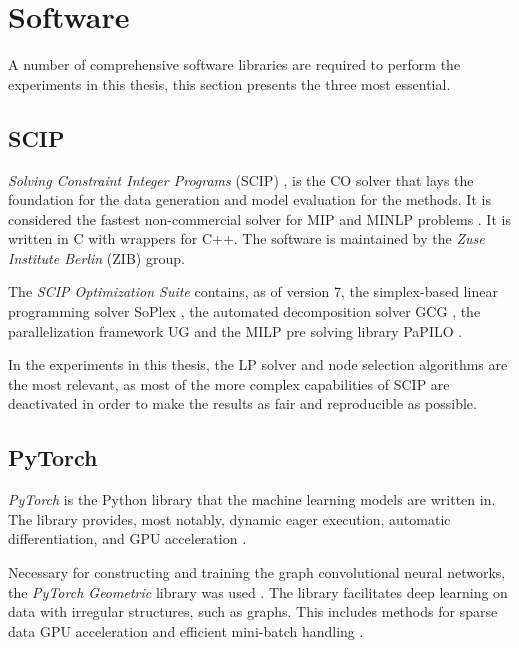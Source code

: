\section{Software}

A number of comprehensive software libraries are required to perform the experiments in this thesis, this section presents the three most essential.  


\subsection{SCIP}

\textit{Solving Constraint Integer Programs }(\gls{SCIP})
\cite{achterberg2009scip}, is the \gls{CO} solver that lays the foundation for the data generation and model evaluation for the methods. It is considered the fastest non-commercial solver for \gls{MIP} and \gls{MINLP} problems \cite{gamrath2020scip}. It is written in C with wrappers for C++. The software is maintained by the\textit{ Zuse Institute Berlin} (ZIB) group. 

The \textit{SCIP Optimization Suite} contains, as of version 7, the simplex-based linear programming solver SoPlex \cite{wunderling1996soplex}, the automated decomposition solver GCG \cite{gamrath2010gcg}, the parallelization framework UG \cite{shinano2018ug} and the \gls{MILP} pre solving library PaPILO \cite{gamrath2020scip}.

In the experiments in this thesis, the LP solver and node selection algorithms are the most relevant, as most of the more complex capabilities of \gls{SCIP} are deactivated in order to make the results as fair and reproducible as possible. 





\subsection{PyTorch}

\textit{PyTorch} is the Python library that the machine learning models are written in. The library provides, most notably, dynamic eager execution, automatic differentiation, and \gls{GPU} acceleration \cite{paszke2019pytorch}. 

Necessary for constructing and training the graph convolutional neural networks, the \textit{PyTorch Geometric} library was used \cite{fey2019pytorchgeometric}. The library facilitates deep learning on data with irregular structures, such as graphs. This includes methods for sparse data GPU acceleration and efficient mini-batch handling \cite{fey2019pytorchgeometric}. 




